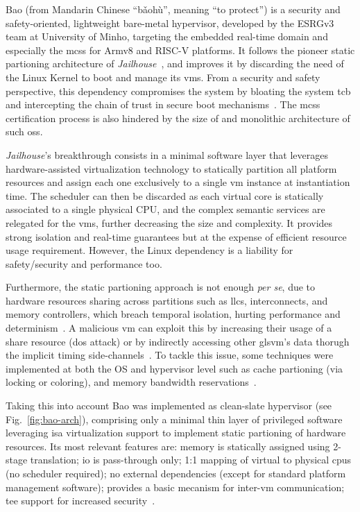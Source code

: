 Bao (from Mandarin Chinese ``bǎohù'', meaning ``to protect'') is a security and
safety-oriented, lightweight bare-metal hypervisor, developed by the ESRGv3 team
at University of Minho, targeting the embedded real-time domain and especially
the \glspl{mcs} for Armv8 and RISC-V platforms. It follows the pioneer static partioning architecture of
\emph{Jailhouse}~\cite{jailhouse}, and improves it by discarding the need of the
Linux Kernel to boot and manage its \glspl{vm}. From a security and
safety perspective, this dependency compromises the system by bloating the
system \gls{tcb} and intercepting the chain of trust in secure boot
mechanisms~\cite{martins_et_al:OASIcs:2020:11779}. The \glspl{mcs} certification
process is also hindered by the size of and monolithic architecture of such \glspl{os}.

\emph{Jailhouse}'s breakthrough consists in a minimal software layer that
leverages hardware-assisted virtualization technology to
statically partition all platform resources and assign each one exclusively to a
single \gls{vm} instance at instantiation time. The scheduler can then be
discarded as each virtual core is statically associated to a single physical
CPU, and the complex semantic services are relegated for the \glspl{vm}, further
decreasing the size and complexity. It provides strong isolation and real-time
guarantees but at the expense of efficient resource usage requirement. However,
the Linux dependency is a liability for safety/security and performance too.

Furthermore, the static partioning approach is not enough \emph{per se}, due to
hardware resources sharing across partitions such as \glspl{llc}, interconnects,
and memory controllers, which breach temporal isolation, hurting performance and
determinism~\cite{bansal2018evaluating,barham2003xen}. A malicious \gls{vm} can exploit this by increasing their
usage of a share resource (\gls{dos} attack) or by indirectly accessing other
gls{vm}'s data thorugh the implicit timing side-channels~\cite{ge2018survey}. To tackle this
issue, some techniques were implemented at both the OS and hypervisor level such
as cache partioning (via locking or coloring), and memory bandwidth
reservations~\cite{martins_et_al:OASIcs:2020:11779}.

Taking this into account Bao was implemented as clean-slate
hypervisor (see Fig.~\ref{fig:bao-arch}), comprising only a minimal thin layer of privileged software
leveraging \gls{isa} virtualization support to implement static partioning of
hardware resources. Its most relevant features are: memory is statically
assigned using 2-stage translation; \gls{io} is pass-through only; 1:1 mapping
of virtual to physical \glspl{cpu} (no scheduler required); no external
dependencies (except for standard platform management software); provides a
basic mecanism for inter-\gls{vm} communication; \gls{tee} support for increased
security~\cite{martins_et_al:OASIcs:2020:11779,baoEmbeddedWorld2020}.

